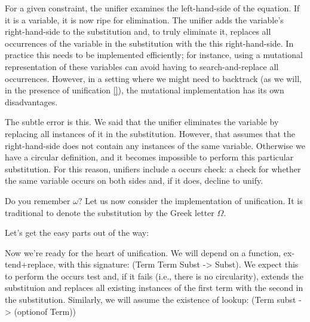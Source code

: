 For a given constraint, the unifier examines the left-hand-side of the equation. If it is
a variable, it is now ripe for elimination. The unifier adds the variable’s right-hand-side
to the substitution and, to truly eliminate it, replaces all occurrences of the variable in
the substitution with the this right-hand-side. In practice this needs to be implemented
efficiently; for instance, using a mutational representation of these variables can avoid
having to search-and-replace all occurrences. However, in a setting where we might
need to backtrack (as we will, in the presence of unification \ref{}), the
mutational implementation has its own disadvantages.


The subtle error is this. We said that the unifier eliminates the variable by replacing
all instances of it in the substitution. However, that assumes that the right-hand-side
does not contain any instances of the same variable. Otherwise we have a circular
definition, and it becomes impossible to perform this particular substitution. For this
reason, unifiers include a occurs check: a check for whether the same variable occurs
on both sides and, if it does, decline to unify.


Do you remember $\omega$?
Let us now consider the implementation of unification. It is traditional to denote
the substitution by the Greek letter $\Omega$.

Let’s get the easy parts out of the way:

Now we’re ready for the heart of unification. We will depend on a function, ex-
tend+replace, with this signature: (Term Term Subst -> Subst). We expect
this to perform the occurs test and, if it fails (i.e., there is no circularity), extends the
substituion and replaces all existing instances of the first term with the second in the
substitution. Similarly, we will assume the existence of lookup: (Term subst ->
(optionof Term))


